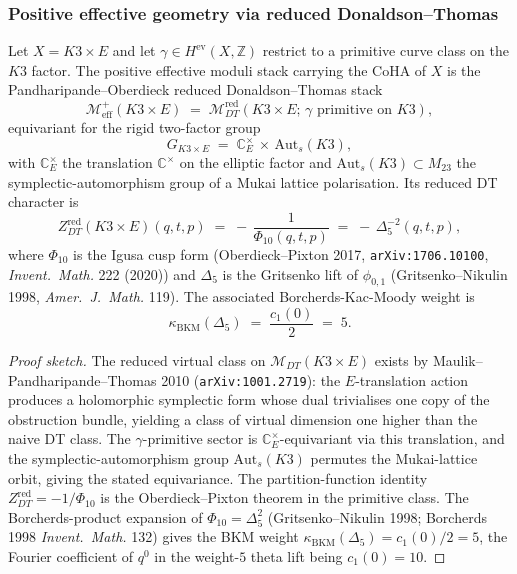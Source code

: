 \providecommand{\kBKM}{\kappa_{\mathrm{BKM}}}
\providecommand{\kch}{\kappa_{\mathrm{ch}}}
\providecommand{\kcat}{\kappa_{\mathrm{cat}}}
\providecommand{\Auts}{\mathrm{Aut}_s}
\providecommand{\Mred}{\mathcal{M}^{\mathrm{red}}_{DT}}
\providecommand{\Meff}{\mathcal{M}^+_{\mathrm{eff}}}

\subsubsection{Positive effective geometry via reduced Donaldson--Thomas}
\label{wn:subsubsec:K3xE-positive-geometry-reduced-DT}

\begin{theorem}
\label{wn:thm:K3xE-positive-geometry-reduced-DT}
Let $X = K3 \times E$ and let $\gamma \in H^{\mathrm{ev}}(X, \mathbb{Z})$ restrict to a
primitive curve class on the $K3$ factor. The positive effective moduli stack carrying
the CoHA of $X$ is the Pandharipande--Oberdieck reduced Donaldson--Thomas stack
\[
\Meff(K3 \times E) \;=\; \Mred(K3 \times E;\, \gamma\text{ primitive on }K3),
\]
equivariant for the rigid two-factor group
\[
G_{K3 \times E} \;=\; \mathbb{C}^\times_E \,\times\, \Auts(K3),
\]
with $\mathbb{C}^\times_E$ the translation $\mathbb{C}^\times$ on the elliptic factor and
$\Auts(K3) \subset M_{23}$ the symplectic-automorphism group of a Mukai lattice polarisation.
Its reduced DT character is
\[
Z^{\mathrm{red}}_{DT}(K3 \times E)(q, t, p)
\;=\; -\,\frac{1}{\Phi_{10}(q, t, p)}
\;=\; -\,\Delta_5^{-2}(q, t, p),
\]
where $\Phi_{10}$ is the Igusa cusp form (Oberdieck--Pixton 2017,
\texttt{arXiv:1706.10100}, \emph{Invent.\ Math.} 222 (2020))
and $\Delta_5$ is the Gritsenko lift of $\phi_{0,1}$
(Gritsenko--Nikulin 1998, \emph{Amer.\ J.\ Math.} 119). The associated Borcherds-Kac-Moody
weight is
\[
\kBKM(\Delta_5) \;=\; \frac{c_1(0)}{2} \;=\; 5.
\]
\end{theorem}

\begin{proof}[Proof sketch]
The reduced virtual class on $\mathcal{M}_{DT}(K3 \times E)$ exists by
Maulik--Pandharipande--Thomas 2010 (\texttt{arXiv:1001.2719}): the $E$-translation action
produces a holomorphic symplectic form whose dual trivialises one copy of the obstruction
bundle, yielding a class of virtual dimension one higher than the naive DT class. The
$\gamma$-primitive sector is $\mathbb{C}^\times_E$-equivariant via this translation, and
the symplectic-automorphism group $\Auts(K3)$ permutes the Mukai-lattice orbit, giving the
stated equivariance. The partition-function identity
$Z^{\mathrm{red}}_{DT} = -1/\Phi_{10}$ is the Oberdieck--Pixton theorem in the primitive
class. The Borcherds-product expansion of $\Phi_{10} = \Delta_5^2$
(Gritsenko--Nikulin 1998; Borcherds 1998 \emph{Invent.\ Math.} 132) gives the BKM weight
$\kBKM(\Delta_5) = c_1(0)/2 = 5$, the Fourier coefficient of $q^0$ in the weight-$5$
theta lift being $c_1(0) = 10$.
\end{proof}

